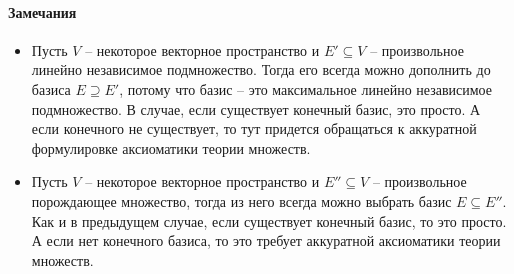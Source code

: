 \paragraph{Замечания}

\begin{itemize}
\item Пусть $V$ -- некоторое векторное пространство и $E'\subseteq V$ -- произвольное линейно независимое подмножество. Тогда его всегда можно дополнить до базиса $E \supseteq E'$, потому что базис -- это максимальное линейно независимое подмножество. В случае, если существует конечный базис, это просто. А если конечного не существует, то тут придется обращаться к аккуратной формулировке аксиоматики теории множеств.

\item Пусть $V$ -- некоторое векторное пространство и $E''\subseteq V$ -- произвольное порождающее множество, тогда из него всегда можно выбрать базис $E\subseteq E''$. Как и в предыдущем случае, если существует конечный базис, то это просто. А если нет конечного базиса, то это требует аккуратной аксиоматики теории множеств.
\end{itemize}

